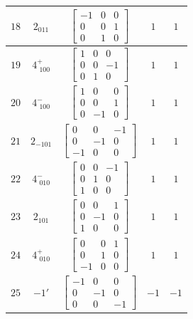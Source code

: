 \documentclass[fleqn,8pt]{jsarticle}
\begin{document}
\begin{longtable}{ccccc}
$ 18 $ & $ 2{}_{011} $ & $ \begin{bmatrix} -1 & 0 & 0 \\ 0 & 0 & 1 \\ 0 & 1 & 0 \end{bmatrix} $ & $ 1 $ & $ 1 $ \\ \hline
$ 19 $ & $ 4^{+}_{\,\,100} $ & $ \begin{bmatrix} 1 & 0 & 0 \\ 0 & 0 & -1 \\ 0 & 1 & 0 \end{bmatrix} $ & $ 1 $ & $ 1 $ \\ \hline
$ 20 $ & $ 4^{-}_{\,\,100} $ & $ \begin{bmatrix} 1 & 0 & 0 \\ 0 & 0 & 1 \\ 0 & -1 & 0 \end{bmatrix} $ & $ 1 $ & $ 1 $ \\ \hline
$ 21 $ & $ 2{}_{-101} $ & $ \begin{bmatrix} 0 & 0 & -1 \\ 0 & -1 & 0 \\ -1 & 0 & 0 \end{bmatrix} $ & $ 1 $ & $ 1 $ \\ \hline
$ 22 $ & $ 4^{-}_{\,\,010} $ & $ \begin{bmatrix} 0 & 0 & -1 \\ 0 & 1 & 0 \\ 1 & 0 & 0 \end{bmatrix} $ & $ 1 $ & $ 1 $ \\ \hline
$ 23 $ & $ 2{}_{101} $ & $ \begin{bmatrix} 0 & 0 & 1 \\ 0 & -1 & 0 \\ 1 & 0 & 0 \end{bmatrix} $ & $ 1 $ & $ 1 $ \\ \hline
$ 24 $ & $ 4^{+}_{\,\,010} $ & $ \begin{bmatrix} 0 & 0 & 1 \\ 0 & 1 & 0 \\ -1 & 0 & 0 \end{bmatrix} $ & $ 1 $ & $ 1 $ \\ \hline
$ 25 $ & $ -1{}' $ & $ \begin{bmatrix} -1 & 0 & 0 \\ 0 & -1 & 0 \\ 0 & 0 & -1 \end{bmatrix} $ & $ -1 $ & $ -1 $ \\ \hline

\end{longtable}
\end{document}
